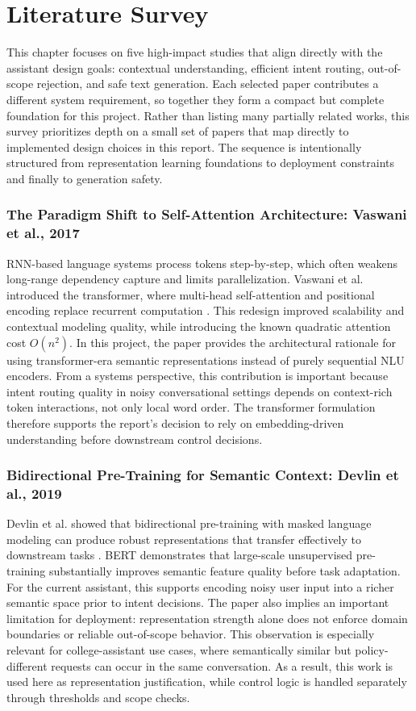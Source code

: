 \documentclass[12pt,onecolumn]{report}
\begin{document}
\onehalfspacing

\chapter{Literature Survey}
This chapter focuses on five high-impact studies that align directly with the assistant design goals: contextual understanding, efficient intent routing, out-of-scope rejection, and safe text generation. Each selected paper contributes a different system requirement, so together they form a compact but complete foundation for this project.
Rather than listing many partially related works, this survey prioritizes depth on a small set of papers that map directly to implemented design choices in this report. The sequence is intentionally structured from representation learning foundations to deployment constraints and finally to generation safety.

\subsection{The Paradigm Shift to Self-Attention Architecture: Vaswani et al., 2017}
RNN-based language systems process tokens step-by-step, which often weakens long-range dependency capture and limits parallelization. Vaswani et al. introduced the transformer, where multi-head self-attention and positional encoding replace recurrent computation \cite{vaswani2017attention}. This redesign improved scalability and contextual modeling quality, while introducing the known quadratic attention cost $O(n^2)$. In this project, the paper provides the architectural rationale for using transformer-era semantic representations instead of purely sequential NLU encoders.
From a systems perspective, this contribution is important because intent routing quality in noisy conversational settings depends on context-rich token interactions, not only local word order. The transformer formulation therefore supports the report's decision to rely on embedding-driven understanding before downstream control decisions.

\subsection{Bidirectional Pre-Training for Semantic Context: Devlin et al., 2019}
Devlin et al. showed that bidirectional pre-training with masked language modeling can produce robust representations that transfer effectively to downstream tasks \cite{devlin2019bert}. BERT demonstrates that large-scale unsupervised pre-training substantially improves semantic feature quality before task adaptation. For the current assistant, this supports encoding noisy user input into a richer semantic space prior to intent decisions. The paper also implies an important limitation for deployment: representation strength alone does not enforce domain boundaries or reliable out-of-scope behavior.
This observation is especially relevant for college-assistant use cases, where semantically similar but policy-different requests can occur in the same conversation. As a result, this work is used here as representation justification, while control logic is handled separately through thresholds and scope checks.
\end{document}
